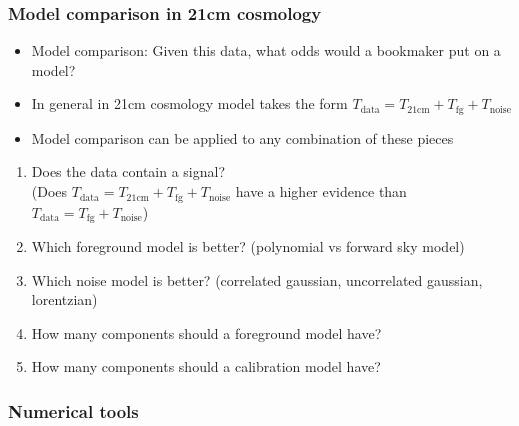 \documentclass[aspectratio=169]{beamer}
\begin{document}
\begin{frame}
    \frametitle{Model comparison in 21cm cosmology}
    \begin{itemize}
        \item Model comparison: Given this data, what odds would a bookmaker put on a model?
        \item In general in 21cm cosmology model takes the form $T_\text{data} = T_\text{21cm} + T_\text{fg} + T_\text{noise}$ 
        \item Model comparison can be applied to any combination of these pieces
    \end{itemize}
    \begin{enumerate}
        \item Does the data contain a signal? \\(Does $T_\text{data} = T_\text{21cm} + T_\text{fg} + T_\text{noise}$ have a higher evidence than $T_\text{data} = T_\text{fg} + T_\text{noise}$)
        \item Which foreground model is better? (polynomial vs forward sky model)
        \item Which noise model is better? (correlated gaussian, uncorrelated gaussian, lorentzian)
        \item How many components should a foreground model have?
        \item How many components should a calibration model have?
    \end{enumerate}
\end{frame}


\begin{frame}
    \frametitle{Numerical tools}
    
\end{frame}
\end{document}
